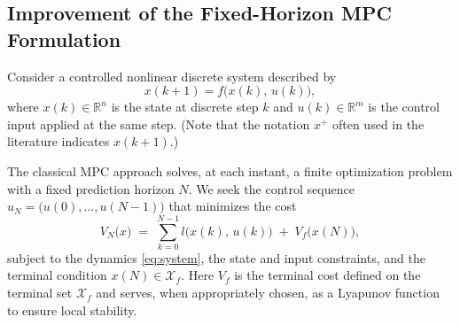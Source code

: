 \subsection{Improvement of the Fixed-Horizon MPC Formulation}

Consider a controlled nonlinear discrete system described by
\begin{equation}
\label{eq:system}
x(k+1) = f\big(x(k),\,u(k)\big),
\end{equation}
where \(x(k)\in\mathbb{R}^n\) is the state at discrete step \(k\) and
\(u(k)\in\mathbb{R}^m\) is the control input applied at the same step.
(Note that the notation \(x^+\) often used in the literature indicates \(x(k+1)\).)

The classical MPC approach solves, at each instant, a finite optimization problem
with a fixed prediction horizon \(N\). We seek the control sequence
\(u_N = \big(u(0),\dots,u(N-1)\big)\) that minimizes the cost
\begin{equation}
\label{eq:cost}
V_N\big(x\big) \;=\; \sum_{k=0}^{N-1} l\big(x(k),\,u(k)\big) \;+\; V_f\big(x(N)\big),
\end{equation}
subject to the dynamics \eqref{eq:system}, the state and input constraints, and the terminal condition
\(x(N)\in\mathcal{X}_f\). Here \(V_f\) is the terminal cost defined on the terminal set \(\mathcal{X}_f\)
and serves, when appropriately chosen, as a Lyapunov function to ensure local stability.


